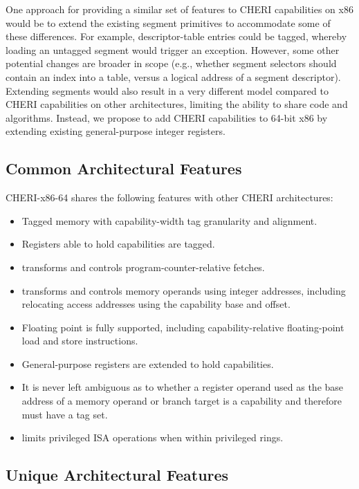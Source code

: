 One approach for providing a similar set of features to CHERI
capabilities on x86 would be to extend the existing segment primitives
to accommodate some of these differences.  For example, descriptor-table
entries could be tagged, whereby loading an untagged segment would trigger
an exception.  However, some other potential changes are broader in
scope (e.g., whether segment selectors should contain an index into a
table, versus a logical address of a segment descriptor).  Extending
segments would also result in a very different model compared to CHERI
capabilities on other architectures, limiting the ability to share code
and algorithms.  Instead, we propose to add CHERI capabilities to 64-bit
x86 by extending existing general-purpose integer registers.

\subsection{Common Architectural Features}

CHERI-x86-64 shares the following features with other CHERI
architectures:

\begin{itemize}
\item Tagged memory with capability-width tag granularity and alignment.
\item Registers able to hold capabilities are tagged.
\item \CIP{} transforms and controls program-counter-relative fetches.
\item \DDC{} transforms and controls memory operands using integer addresses,
  including relocating access addresses using the capability base and offset.
\item Floating point is fully supported, including capability-relative
  floating-point load and store instructions.
\item General-purpose registers are extended to hold capabilities.
\item It is never left ambiguous as to whether a register operand used
  as the base address of a memory operand or branch target
  is a capability and therefore must have a tag set.
\item \cappermASR limits privileged ISA operations when within
  privileged rings.
\end{itemize}

\subsection{Unique Architectural Features}

